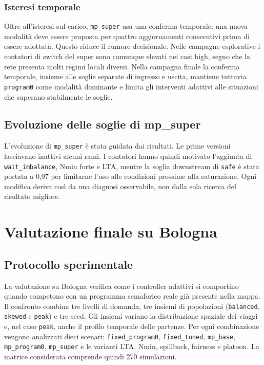 \documentclass[12pt,a4paper,oneside]{report}
\numberwithin{equation}{chapter}
\begin{document}
\subsection{Isteresi temporale}

Oltre all'isteresi sul carico, \texttt{mp\_super} usa una conferma temporale:
una nuova modalità deve essere proposta per quattro aggiornamenti consecutivi prima di
essere adottata. Questo riduce il rumore decisionale. Nelle campagne
esplorative i contatori di switch del super sono comunque elevati nei casi high,
segno che la rete presenta molti regimi locali diversi. Nella campagna finale
la conferma temporale, insieme alle soglie separate di ingresso e uscita,
mantiene tuttavia \texttt{program0} come modalità dominante e limita gli
interventi adattivi alle situazioni che superano stabilmente le soglie.

\enlargethispage{2\baselineskip}
\section{Evoluzione delle soglie di mp\_super}

L'evoluzione di \texttt{mp\_super} è stata guidata dai risultati. Le prime
versioni lasciavano inattivi alcuni rami. I contatori hanno quindi motivato
l'aggiunta di \texttt{wait\_imbalance}, Nmin forte e LTA, mentre la soglia
downstream di \texttt{safe} è stata portata a 0,97 per limitarne l'uso alle
condizioni prossime alla saturazione. Ogni modifica deriva così da una diagnosi
osservabile, non dalla sola ricerca del risultato migliore.



\chapter{Valutazione finale su Bologna}
\label{chap:bologna-risultati}

\section{Protocollo sperimentale}

La valutazione su Bologna verifica come i controller adattivi si comportino
quando competono con un programma semaforico reale già presente nella mappa.
Il confronto combina tre livelli di domanda, tre insiemi di popolazioni
(\texttt{balanced}, \texttt{skewed} e \texttt{peak}) e tre seed. Gli insiemi
variano la distribuzione spaziale dei viaggi e, nel caso \texttt{peak}, anche
il profilo temporale delle partenze. Per ogni combinazione vengono analizzati
dieci scenari: \texttt{fixed\_program0}, \texttt{fixed\_tuned},
\texttt{mp\_base}, \texttt{mp\_program0}, \texttt{mp\_super} e le varianti LTA,
Nmin, spillback, fairness e platoon. La matrice considerata comprende quindi
270 simulazioni.
\end{document}
